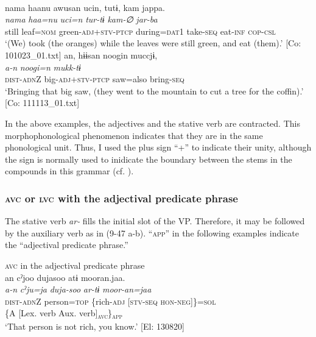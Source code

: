\ex{}\\
    \glll  nama  haanu  awusan  ucin,  tutɨ,  kam  jappa.\\
      \textit{nama}  \textit{haa=nu}  \textit{}  \textit{uci=n}  \textit{tur-tɨ}  \textit{kam-∅}  \textit{jar-ba}\\
      still  leaf=\textsc{nom}  green-\textsc{adj}+\textsc{stv}-\textsc{ptcp}  during=\textsc{dat}1  take-\textsc{seq}  eat-\textsc{inf}  \textsc{cop}-\textsc{csl}\\
      \glt       ‘(We) took (the oranges) while the leaves were still green, and eat (them).’ [Co: 101023\_01.txt]
\ex %
\glll an,  hɨɨsan  noogin  muccjɨ,\\
      \textit{a-n}  \textit{}  \textit{noogi=n}  \textit{mukk-tɨ}\\
      \textsc{dist}-\textsc{adn}Z  big-\textsc{adj}+\textsc{stv}-\textsc{ptcp}  saw=also  bring-\textsc{seq}\\
      \glt       ‘Bringing that big saw, (they went to the mountain to cut a tree for the coffin).’ [Co: 111113\_01.txt]
    \z
\z

In the above examples, the adjectives and the stative verb are contracted. This morphophonological phenomenon indicates that they are in the same phonological unit. Thus, I used the plus sign “+” to indicate their unity, although the sign is normally used to inidicate the boundary between the stems in the compounds in this grammar (cf. ).

\subsubsection{\textsc{avc} or \textsc{lvc} with the adjectival predicate phrase}\label{sec:9.2.2.3}

The stative verb \textit{ar-} fills the initial slot of the VP. Therefore, it may be followed by the auxiliary verb as in (9-47 a-b). “\textsc{app}” in the following examples indicate the “adjectival predicate phrase.”

\ea   \textsc{avc} in the adjectival predicate phrase \label{ex:9.47}
\ea\relax [= (8-48)]\\
    \gllll  an  cˀjoo  dujasoo  atɨ  mooran.jaa.\\
      \textit{a-n}  \textit{cˀju=ja}  \textit{duja-soo}  \textit{ar-tɨ}  \textit{moor-an=jaa}\\
      \textsc{dist}-\textsc{adn}Z  person=\textsc{top}  \{rich-\textsc{adj}  [\textsc{stv}-\textsc{seq}  \textsc{hon}-\textsc{neg}]\}=\textsc{sol}\\
          \{A  [Lex. verb  Aux. verb]\textsubscript{\textsc{avc}}\}\textsubscript{\textsc{app}}\\
      \glt       ‘That person is not rich, you know.’ [El: 130820]

